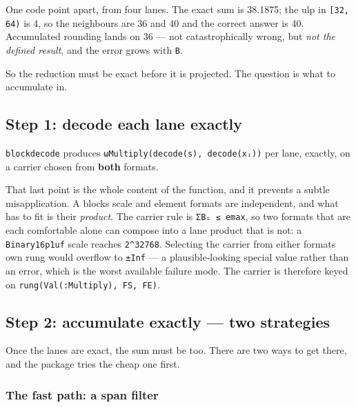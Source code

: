 One code point apart, from four lanes. The exact sum is 38.1875; the ulp in \texttt{[32, 64)} is 4, so the neighbours are 36 and 40 and the correct answer is 40. Accumulated rounding lands on 36 — not catastrophically wrong, but \emph{not the defined result}, and the error grows with \texttt{B}.



So the reduction must be exact before it is projected. The question is what to accumulate in.



\subsection{Step 1: decode each lane exactly}



\label{10910878240910788282}{}


\texttt{blockdecode} produces \texttt{ωMultiply(\allowbreak{}decode(\allowbreak{}s), decode(\allowbreak{}xᵢ))} per lane, exactly, on a carrier chosen from \textbf{both} formats.



That last point is the whole content of the function, and it prevents a subtle misapplication. A block{\textquotesingle}s scale and element formats are independent, and what has to fit is their \emph{product}. The carrier rule is \texttt{ΣBᵢ ≤ emax}, so two formats that are each comfortable alone can compose into a lane product that is not: a \texttt{Binary16p1uf} scale reaches \texttt{2{\textasciicircum}32768}. Selecting the carrier from either format{\textquotesingle}s own rung would overflow to \texttt{±Inf} — a plausible-looking special value rather than an error, which is the worst available failure mode. The carrier is therefore keyed on \texttt{rung(\allowbreak{}Val(\allowbreak{}:Multiply), FS, FE)}.



\subsection{Step 2: accumulate exactly — two strategies}



\label{15670534060327343851}{}


Once the lanes are exact, the sum must be too. There are two ways to get there, and the package tries the cheap one first.



\subsubsection{The fast path: a span filter}



